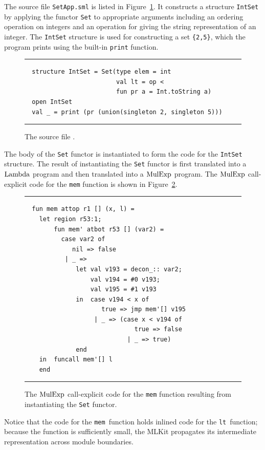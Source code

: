 \documentclass[12pt]{book}
\begin{document}
The source file {\tt SetApp.sml} is listed in
Figure~\ref{SetApp.fig}. It constructs a structure {\tt IntSet} by
applying the functor {\tt Set} to appropriate arguments including an
ordering operation on integers and an operation for giving the string
representation of an integer. The {\tt IntSet} structure is used for
constructing a set \verb+{2,5}+, which the program prints using the
built-in {\tt print} function.
\begin{figure}[ht]
\hrule \medskip
\begin{verbatim}
  structure IntSet = Set(type elem = int
                         val lt = op <
                         fun pr a = Int.toString a)
  open IntSet
  val _ = print (pr (union(singleton 2, singleton 5)))
\end{verbatim}
\caption{The source file .}
\medskip \hrule \label{SetApp.fig}
\end{figure}

The body of the {\tt Set} functor is instantiated to form the code for
the {\tt IntSet} structure. The result of instantiating the {\tt Set}
functor is first translated into a $\hbox{\rm Lambda}$ program and then translated
into a $\hbox{\rm MulExp}$ program. The $\hbox{\rm MulExp}$ call-explicit code for the
{\tt mem} function is shown in Figure~\ref{set_inst_mulexp.fig}.
\begin{figure}[ht]
\hrule \medskip
\begin{verbatim}
  fun mem attop r1 [] (x, l) =
    let region r53:1;
        fun mem' atbot r53 [] (var2) =
          case var2 of
             nil => false
           | _ =>
              let val v193 = decon_:: var2;
                  val v194 = #0 v193;
                  val v195 = #1 v193
              in  case v194 < x of
                     true => jmp mem'[] v195
                   | _ => (case x < v194 of
                              true => false
                            | _ => true)
              end
    in  funcall mem'[] l
    end
\end{verbatim}
\caption{The $\hbox{\rm MulExp}$ call-explicit code for the {\tt mem}
  function resulting from instantiating the {\tt Set} functor.}
\medskip \hrule
\label{set_inst_mulexp.fig}
\end{figure}

Notice that the code for the {\tt mem}~function holds inlined code for
the {\tt lt}~function; because the function is sufficiently small, the MLKit propagates its intermediate representation
 across module boundaries.

\end{document}

